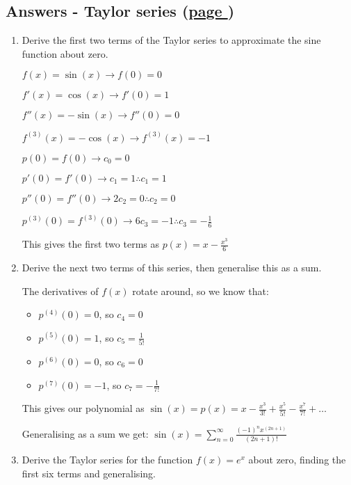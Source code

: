\documentclass[../main.tex]{subfiles}
\begin{document}
\hypertarget{taylorseriesanswers}{\subsection*{Answers - Taylor series (\hyperlink{taylorserieslink} {page \pageref{taylor series}})}}

\label{Taylor series answers}
\begin{enumerate}[itemsep=0.7cm]
    \item 
    Derive the first two terms of the Taylor series to approximate the sine function about zero.

    $f(x) = \sin{(x)} \rightarrow f(0)=0$

    $f'(x) = \cos{(x)} \rightarrow f'(0)=1$

    $f''(x) = -\sin{(x)} \rightarrow f''(0)=0$
    
    $f^{(3)}(x) = -\cos{(x)} \rightarrow f^{(3)}(x)=-1$

    $p(0) = f(0) \rightarrow c_0 = 0$

    $p'(0) = f'(0) \rightarrow c_1 = 1 \therefore c_1 = 1$

    $p''(0) = f''(0) \rightarrow 2c_2 = 0 \therefore c_2 = 0$

    $p^{(3)}(0) = f^{(3)}(0) \rightarrow 6c_3 = -1 \therefore c_3 = -\frac{1}{6}$

    This gives the first two terms as $p(x) = x - \frac{x^3}{6}$

    \item 
    Derive the next two terms of this series, then generalise this as a sum.

    The derivatives of $f(x)$ rotate around, so we know that:
    \begin{itemize}
        \item     $p^{(4)}(0)=0$, so $c_4 = 0$
        \item     $p^{(5)}(0)=1$, so $c_5 = \frac{1}{5!}$
        \item     $p^{(6)}(0)=0$, so $c_6 = 0$
        \item     $p^{(7)}(0)=-1$, so $c_7 = -\frac{1}{7!}$  
    \end{itemize}

    This gives our polynomial as $\sin{(x)} = p(x) = x - \frac{x^3}{3!} + \frac{x^5}{5!} - \frac{x^7}{7!} + \dots$

    Generalising as a sum we get:
    $\sin{(x)}= \sum_{n=0}^{\infty} \frac{(-1)^n x^{(2n+1)}}{(2n+1)!}$

    \item
    Derive the Taylor series for the function $f(x)=e^x$ about zero, finding the first six terms and generalising.


\end{enumerate}
\end{document}
